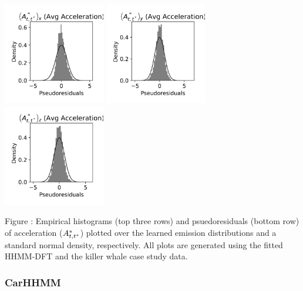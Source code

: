 \documentclass{article}
\begin{document}
\begin{center}
        \includegraphics[width=1.75in]{../Plots/HHMM_psedoresids_Ax.png}
        \includegraphics[width=1.75in]{../Plots/HHMM_psedoresids_Ay.png}
        \includegraphics[width=1.75in]{../Plots/HHMM_psedoresids_Az.png}
        \end{center}
        
        \noindent Figure : Empirical histograms (top three rows) and psuedoresiduals (bottom row) of acceleration ($A^*_{t,t^*}$) plotted over the learned emission distributions and a standard normal density, respectively. All plots are generated using the fitted HHMM-DFT and the killer whale case study data.
        \addtocounter{fignum}{1}
        
        \newpage
        
        \subsubsection{CarHHMM}
        
\end{document}
